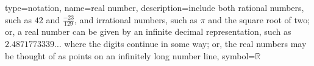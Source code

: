 



 {
  type=notation,
  name={real number},
  description={include both rational numbers, such as $42$ and $\frac{-23}{129}$, and irrational numbers, such as $\pi$ and the square root of two; or, a real number can be given by an infinite decimal representation, such as $2.4871773339\ldots$ where the digits continue in some way; or, the real numbers may be thought of as points on an infinitely long number line},
  symbol={\ensuremath{\mathbb{R}}}
}
